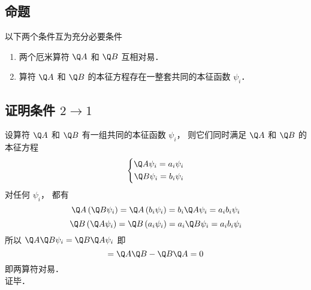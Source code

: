 \subsection{命题}
以下两个条件互为充分必要条件
\begin{enumerate}
  \item 两个厄米算符 $\Q A$ 和 $\Q B$ 互相对易．
  \item 算符 $\Q A$ 和 $\Q B$ 的本征方程存在一整套共同的本征函数 ${\psi _i}$．
\end{enumerate}
\subsection{证明条件 $2 \to 1$}
设算符 $\Q A$ 和 $\Q B$ 有一组共同的本征函数 ${\psi _i}$，  则它们同时满足 $\Q A$ 和 $\Q B$ 的本征方程
\begin{equation}
  \left\{ \begin{aligned}
\Q A{\psi _i} = {a_i}{\psi _i}\\
\Q B{\psi _i} = {b_i}{\psi _i}
\end{aligned} \right.
\end{equation}
对任何 ${\psi _i}$，  都有
\begin{equation}
  \Q A\left( {\Q B{\psi _i}} \right) = \Q A\left( {{b_i}{\psi _i}} \right) = {b_i}\Q A{\psi _i} = {a_i}{b_i}{\psi _i}
\end{equation}
\begin{equation}
  \Q B\left( {\Q A{\psi _i}} \right) = \Q B\left( {{a_i}{\psi _i}} \right) = {a_i}\Q B{\psi _i} = {a_i}{b_i}{\psi _i}
\end{equation}
所以 $\Q A\Q B{\psi _i} = \Q B\Q A{\psi _i}$ 即
\begin{equation}
[\Q A,\Q B] = \Q A\Q B - \Q B\Q A = 0
\end{equation}
即两算符对易．\\
证毕．
